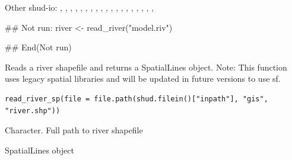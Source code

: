 \documentclass[a4paper]{book}
\begin{document}
\begin{SeeAlso}\relax
Other shud-io: 
,
,
,
,
,
,
,
,
,
,
,
,
,
,
,
,
,
,
,
\end{SeeAlso}
%
\begin{Examples}
\begin{ExampleCode}
## Not run: 
river <- read_river("model.riv")

## End(Not run)
\end{ExampleCode}
\end{Examples}
%
\begin{Description}\relax
Reads a river shapefile and returns a SpatialLines object.
Note: This function uses legacy spatial libraries and will be updated
in future versions to use sf.
\end{Description}
%
\begin{Usage}
\begin{verbatim}
read_river_sp(file = file.path(shud.filein()["inpath"], "gis", "river.shp"))
\end{verbatim}
\end{Usage}
%
\begin{Arguments}
\begin{ldescription}
\item[\code{file}] Character. Full path to river shapefile
\end{ldescription}
\end{Arguments}
%
\begin{Value}
SpatialLines object
\end{Value}
%
\end{document}
